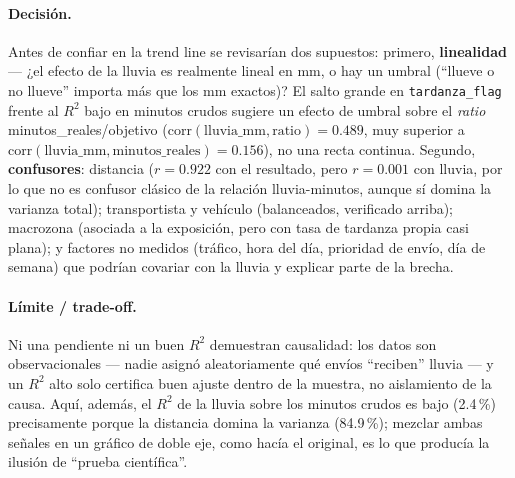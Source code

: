 \paragraph{Decisión.} Antes de confiar en la trend line se revisarían dos supuestos: primero, \textbf{linealidad} --- ¿el efecto de la lluvia es realmente lineal en mm, o hay un umbral (``llueve o no llueve'' importa más que los mm exactos)? El salto grande en \lstinline|tardanza_flag| frente al $R^2$ bajo en minutos crudos sugiere un efecto de umbral sobre el \emph{ratio} minutos\_reales/objetivo ($\mathrm{corr}(\text{lluvia\_mm}, \text{ratio}) = 0.489$, muy superior a $\mathrm{corr}(\text{lluvia\_mm}, \text{minutos\_reales}) = 0.156$), no una recta continua. Segundo, \textbf{confusores}: distancia ($r=0.922$ con el resultado, pero $r=0.001$ con lluvia, por lo que no es confusor clásico de la relación lluvia-minutos, aunque sí domina la varianza total); transportista y vehículo (balanceados, verificado arriba); macrozona (asociada a la exposición, pero con tasa de tardanza propia casi plana); y factores no medidos (tráfico, hora del día, prioridad de envío, día de semana) que podrían covariar con la lluvia y explicar parte de la brecha.

\paragraph{Límite / trade-off.} Ni una pendiente ni un buen $R^2$ demuestran causalidad: los datos son observacionales --- nadie asignó aleatoriamente qué envíos ``reciben'' lluvia --- y un $R^2$ alto solo certifica buen ajuste dentro de la muestra, no aislamiento de la causa. Aquí, además, el $R^2$ de la lluvia sobre los minutos crudos es bajo (2.4\,\%) precisamente porque la distancia domina la varianza (84.9\,\%); mezclar ambas señales en un gráfico de doble eje, como hacía el original, es lo que producía la ilusión de ``prueba científica''.

